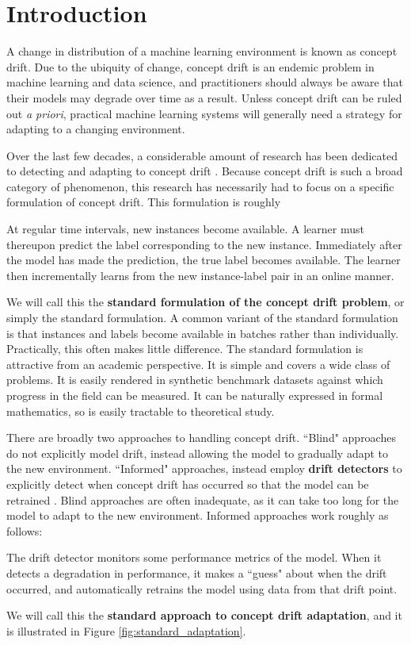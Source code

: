 \chapter{Introduction} \label{chapt:Introduction}

A change in distribution of a machine learning environment is known as concept drift. Due to the ubiquity of change, concept drift is an endemic problem in machine learning and data science, and practitioners should always be aware that their models may degrade over time as a result. Unless concept drift can be ruled out {\it a priori}, practical machine learning systems will generally need a strategy for adapting to a changing environment.

Over the last few decades, a considerable amount of research has been dedicated to detecting and adapting to concept drift \cite{gama_survey}\cite{barros_comparison}. Because concept drift is such a broad category of phenomenon, this research has necessarily had to focus on a specific formulation of concept drift. This formulation is roughly
\begin{displayquote}
  At regular time intervals, new instances become available. A learner must thereupon predict the label corresponding to the new instance. Immediately after the model has made the prediction, the true label becomes available. The learner then incrementally learns from the new instance-label pair in an online manner.
\end{displayquote}
We will call this the {\bf standard formulation of the concept drift problem}, or simply the standard formulation. A common variant of the standard formulation is that instances and labels become available in batches rather than individually. Practically, this often makes little difference. The standard formulation is attractive from an academic perspective. It is simple and covers a wide class of problems. It is easily rendered in synthetic benchmark datasets against which progress in the field can be measured. It can be naturally expressed in formal mathematics, so is easily tractable to theoretical study.

There are broadly two approaches to handling concept drift. ``Blind" approaches do not explicitly model drift, instead allowing the model to gradually adapt to the new environment. ``Informed" approaches, instead employ {\bf drift detectors} to explicitly detect when concept drift has occurred so that the model can be retrained \cite{gama_survey}. Blind approaches are often inadequate, as it can take too long for the model to adapt to the new environment. Informed approaches work roughly as follows:
\begin{displayquote}
  The drift detector monitors some performance metrics of the model. When it detects a degradation in performance, it makes a ``guess" about when the drift occurred, and automatically retrains the model using data from that drift point.
\end{displayquote}
We will call this the {\bf standard approach to concept drift adaptation}, and it is illustrated in Figure \ref{fig:standard_adaptation}.

